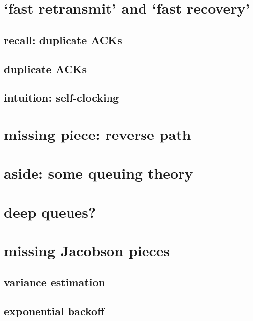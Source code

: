 \section{`fast retransmit' and `fast recovery'}

\subsection{recall: duplicate ACKs}


\subsection{duplicate ACKs}

\subsection{intuition: self-clocking}


\section{missing piece: reverse path}


\section{aside: some queuing theory}


\section{deep queues?}


\section{missing Jacobson pieces}
\subsection{variance estimation}


\subsection{exponential backoff}


